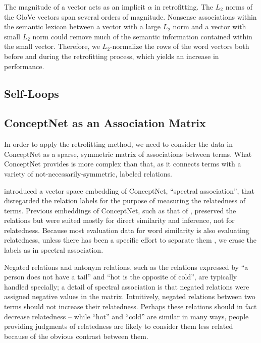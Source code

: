 \documentclass[letterpaper]{article}
\begin{document}
The magnitude of a vector acts as an implicit $\alpha$ in retrofitting.
The $L_2$ norms of the GloVe vectors span several orders of magnitude.
Nonsense associations within the semantic lexicon between a vector with a large
$L_2$ norm and a vector with small $L_2$ norm could remove much of the semantic
information contained within the small vector. Therefore, we $L_2$-normalize
the rows of the word vectors both before and during the retrofitting process,
which yields an increase in performance.

\subsection{Self-Loops}

\subsection{ConceptNet as an Association Matrix}

In order to apply the retrofitting method, we need to consider the data in
ConceptNet as a sparse, symmetric matrix of associations between terms. What
ConceptNet provides is more complex than that, as it connects terms with a
variety of not-necessarily-symmetric, labeled relations.

 introduced a vector space embedding of ConceptNet,
``spectral association'', that disregarded the relation labels for the purpose
of measuring the relatedness of terms. Previous embeddings of ConceptNet, such
as that of , preserved the relations but were
suited mostly for direct similarity and inference, not for relatedness. Because
most evaluation data for word similarity is also evaluating relatedness, unless
there has been a specific effort to separate them \cite{agirre2009similarity},
we erase the labels as in spectral association.

Negated relations and antonym relations, such as the relations expressed by
``a person does not have a tail'' and ``hot is the opposite of cold'', are
typically handled specially; a detail of spectral association is that negated
relations were assigned negative values in the matrix. Intuitively, negated
relations between two terms should not increase their relatedness. Perhaps
these relations should in fact decrease relatedness -- while ``hot'' and
``cold'' are similar in many ways, people providing judgments of relatedness
are likely to consider them less related because of the obvious contrast
between them.
\end{document}
